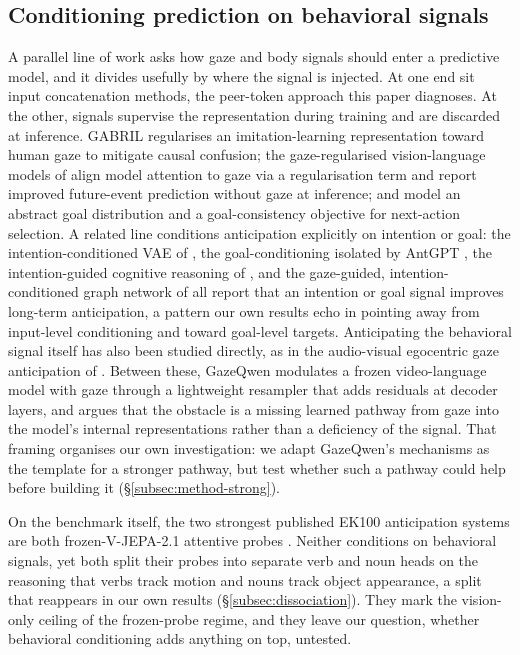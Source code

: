 \subsection{Conditioning prediction on behavioral signals}
\label{subsec:bg-gaze}

A parallel line of work asks how gaze and body signals should enter a predictive
model, and it divides usefully by where the signal is injected. At one end sit
input concatenation methods, the peer-token approach this paper diagnoses. At the
other, signals supervise the representation during training and are discarded at
inference. GABRIL \citep{banayeeanzade2025gabril} regularises an
imitation-learning representation toward human gaze to mitigate causal confusion;
the gaze-regularised vision-language models of \citet{pani2026gazereg} align model
attention to gaze via a regularisation term and report improved future-event
prediction without gaze at inference; and \citet{royfernando2022abstractgoal}
model an abstract goal distribution and a goal-consistency objective for
next-action selection. A related line conditions anticipation explicitly on
intention or goal: the intention-conditioned VAE of \citet{mascaro2023icvae}, the
goal-conditioning isolated by AntGPT \citep{zhao2024antgpt}, the intention-guided
cognitive reasoning of \citet{chu2026intention}, and the gaze-guided,
intention-conditioned graph network of \citet{ozdel2024gazegnn} all report that an
intention or goal signal improves long-term anticipation, a pattern our own
results echo in pointing away from input-level conditioning and toward goal-level
targets. Anticipating the behavioral signal itself has also been studied
directly, as in the audio-visual egocentric gaze anticipation of
\citet{lai2024listentolook}. Between these, GazeQwen \citep{pham2026gazeqwen}
modulates a frozen video-language model with gaze through a lightweight resampler
that adds residuals at decoder layers, and argues that the obstacle is a missing
learned pathway from gaze into the model's internal representations rather than a
deficiency of the signal. That framing organises our own investigation: we adapt
GazeQwen's mechanisms as the template for a stronger pathway, but test whether
such a pathway could help before building it (\S\ref{subsec:method-strong}).

On the benchmark itself, the two strongest published EK100 anticipation systems
are both frozen-V-JEPA-2.1 attentive probes \citep{chu2026jfaa, wang2026tapjepa}.
Neither conditions on behavioral signals, yet both split their probes into
separate verb and noun heads on the reasoning that verbs track motion and nouns
track object appearance, a split that reappears in our own results
(\S\ref{subsec:dissociation}). They mark the vision-only ceiling of the
frozen-probe regime, and they leave our question, whether behavioral conditioning
adds anything on top, untested.

